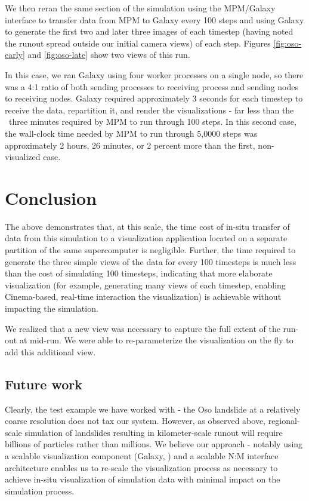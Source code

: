 \documentclass[journal]{IEEEtran}
\begin{document}
We then reran the same section of the simulation using the MPM/Galaxy interface to transfer data from MPM to Galaxy every 100 steps and using Galaxy to generate the first two and later three images of each timestep (having noted the runout spread outside our initial camera views) of each step.  Figures \ref{fig:oso-early} and \ref{fig:oso-late} show two views of this run.

In this case, 
we ran Galaxy using four worker processes on a single node, so there was a 4:1 ratio of both sending processes to receiving process and sending nodes to receiving nodes.   Galaxy required approximately 3 seconds for each timestep to receive the data, repartition it, and render the visualizations - far less than the ~three minutes required by MPM to run through 100 steps.   In this second case, the wall-clock time needed by MPM to run through 5,0000 steps was approximately 2 hours, 26 minutes, or 2 percent more than the first, non-visualized case.

\section{Conclusion}

The above demonstrates that, at this scale, the time cost of in-situ transfer of data from this simulation to a visualization application located on a separate partition of the same supercomputer is negligible.   Further, the time required to generate the three simple views of the data for every 100 timesteps is much less than the cost of simulating 100 timesteps, indicating that more elaborate visualization (for example, generating many views of each timestep, enabling Cinema-based, real-time interaction the visualization) is achievable without impacting the simulation.

We realized that a new view was necessary to capture the full extent of the run-out at mid-run.   We were able to re-parameterize the visualization on the fly to add this additional view.   

\subsection{Future work}

Clearly, the test example we have worked with - the Oso landslide at a relatively coarse resolution does not tax our system.   However, as observed above, regional-scale simulation of landslides resulting in kilometer-scale runout will require billions of particles rather than millions.   We believe our approach - notably using a scalable visualization component (Galaxy, \cite{abram2018galaxy}) and a scalable N:M interface architecture enables us to re-scale the visualization process as necessary to achieve in-situ visualization of simulation data with minimal impact on the simulation process.  
\end{document}
